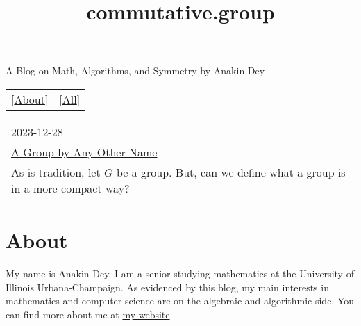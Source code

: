 \documentclass{article}
\title{commutative.group}
\begin{document}
\maketitle
\newline
\begin{center}
  A Blog on Math, Algorithms, and Symmetry by Anakin Dey
\end{center}
\begin{table}
  \centering
  \begin{tabular}{cc}
    \LARGE[\href{About.html}{About}] & \LARGE[\href{All-Posts.html}{All}]
  \end{tabular}
\end{table}


\begin{table}
  \centering
  \begin{tabular}{|l|}
    \hline
    \large 2023-12-28 \\
    \LARGE \href{posts/other_name.html}{A Group by Any Other Name} \\
    As is tradition, let $G$ be a group. But, can we define what a group is in a more compact way? \\
    \hline
  \end{tabular}
\end{table}

\part*{\centering About}

\newline

My name is Anakin Dey.
I am a senior studying mathematics at the University of Illinois Urbana-Champaign.
As evidenced by this blog, my main interests in mathematics and computer science are on the algebraic and algorithmic side.
You can find more about me at \href{https://www.anakin-dey.com/}{my website}.
\end{document}
